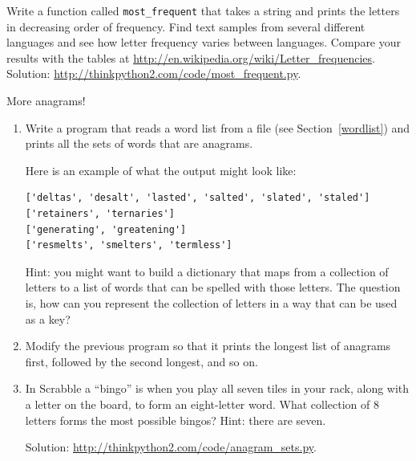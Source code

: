 \documentclass[10pt]{book}
\begin{document}
\begin{exercise}

Write a function called \verb"most_frequent" that takes a string and
prints the letters in decreasing order of frequency.  Find text
samples from several different languages and see how letter frequency
varies between languages.  Compare your results with the tables at
\url{http://en.wikipedia.org/wiki/Letter_frequencies}.  Solution:
\url{http://thinkpython2.com/code/most_frequent.py}.   

\end{exercise}


\begin{exercise}
\label{anagrams}

More anagrams!

\begin{enumerate}

\item Write a program
that reads a word list from a file (see Section~\ref{wordlist}) and
prints all the sets of words that are anagrams.

Here is an example of what the output might look like:

\begin{verbatim}
['deltas', 'desalt', 'lasted', 'salted', 'slated', 'staled']
['retainers', 'ternaries']
['generating', 'greatening']
['resmelts', 'smelters', 'termless']
\end{verbatim}
%
Hint: you might want to build a dictionary that maps from a
collection of letters to a list of words that can be spelled with those
letters.  The question is, how can you represent the collection of
letters in a way that can be used as a key?

\item Modify the previous program so that it prints the longest list
of anagrams first, followed by the second longest, and so on.

\item In Scrabble a ``bingo'' is when you play all seven tiles in
your rack, along with a letter on the board, to form an eight-letter
word.  What collection of 8 letters forms the most possible bingos?
Hint: there are seven.


Solution: \url{http://thinkpython2.com/code/anagram_sets.py}.

\end{enumerate}
\end{exercise}
\end{document}
